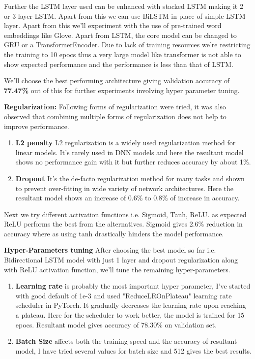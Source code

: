 \documentclass[10pt,a4paper]{article}
\begin{document}
	Further the LSTM layer used can be enhanced with stacked LSTM making it 2 or 3 layer LSTM. Apart from this we can use BiLSTM in place of simple LSTM layer. Apart from this we'll experiment with the use of pre-trained word embeddings like Glove. Apart from LSTM, the core model can be changed to GRU or a TransformerEncoder. Due to lack of training resources we're restricting the training to 10 epocs thus a very large model like transformer is not able to show expected performance and the performance is less than that of LSTM.
	
	We'll choose the best performing architecture giving validation accuracy of \textbf{77.47\%} out of this for further experiments involving hyper parameter tuning.
		
\textbf{Regularization:} Following forms of regularization were tried, it was also observed that combining multiple forms of regularization does not help to improve performance.\\

\begin{enumerate}

\item \textbf{L2 penalty} L2 regularization is a widely used regularization method for linear models. It's rarely used in DNN models and here the resultant model shows no performance gain with it but further reduces accuracy by about 1\%. 

\item \textbf{Dropout} It's the de-facto regularization method for many tasks and shown to prevent over-fitting in wide variety of network architectures. Here the resultant model shows an increase of 0.6\% to 0.8\% of increase in accuracy.

\end{enumerate}

Next we try different activation functions i.e. Sigmoid, Tanh, ReLU. as expected ReLU performs the best from the alternatives. Sigmoid gives 2.6\% reduction in accuracy where as using tanh drastically hinders the model performance.

\textbf{Hyper-Parameters tuning} After choosing the best model so far i.e. Bidirectional LSTM model with just 1 layer and dropout regularization along with ReLU activation function, we'll tune the remaining hyper-parameters.

\begin{enumerate}
\item \textbf{Learning rate} is probably the most important hyper parameter, I've started with good default of 1e-3 and used "ReduceLROnPlateau" learning rate scheduler in PyTorch. It gradually decreases the learning rate upon reaching a plateau. Here for the scheduler to work better, the model is trained for 15 epocs. Resultant model gives accuracy of 78.30\% on validation set.

\item \textbf{Batch Size} affects both the training speed and the accuracy of resultant model, I have tried several values for batch size and 512 gives the best results.

\end{enumerate}
\end{document}
